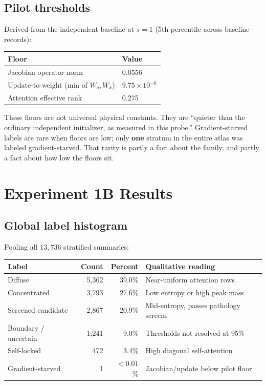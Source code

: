 \documentclass[11pt,a4paper]{report}
\begin{document}
\section{Pilot thresholds}
\label{sec:pilot-thresholds}

Derived from the independent baseline at $s=1$ (5th percentile across baseline records):
\begin{center}
\begin{tabular}{ll}
\toprule
Floor & Value \\
\midrule
Jacobian operator norm & 0.0556 \\
Update-to-weight (min of $W_q,W_k$) & $9.75\times 10^{-6}$ \\
Attention effective rank & 0.275 \\
\bottomrule
\end{tabular}
\end{center}

These floors are not universal physical constants. They are ``quieter than the ordinary independent initializer, as measured in this probe.'' Gradient-starved labels are rare when floors are low; only \textbf{one} stratum in the entire atlas was labeled gradient-starved. That rarity is partly a fact about the family, and partly a fact about how low the floors sit.

\chapter{Experiment 1B Results}

\section{Global label histogram}

Pooling all $13{,}736$ stratified summaries:

\begin{center}
\begin{tabular}{lrrl}
\toprule
Label & Count & Percent & Qualitative reading \\
\midrule
Diffuse & 5{,}362 & 39.0\% & Near-uniform attention rows \\
Concentrated & 3{,}793 & 27.6\% & Low entropy or high peak mass \\
Screened candidate & 2{,}867 & 20.9\% & Mid-entropy, passes pathology screens \\
Boundary / uncertain & 1{,}241 & 9.0\% & Thresholds not resolved at 95\% \\
Self-locked & 472 & 3.4\% & High diagonal self-attention \\
Gradient-starved & 1 & $<0.01$\% & Jacobian/update below pilot floor \\
\bottomrule
\end{tabular}
\end{center}
\end{document}
